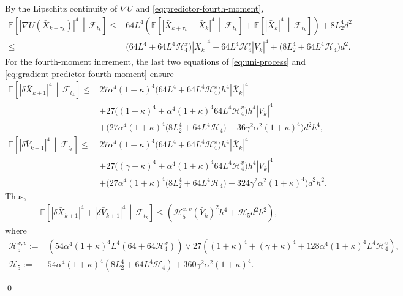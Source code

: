 \documentclass[12pt]{article}
\newenvironment{redtext}
  {\color{black}\ignorespaces}
  {\ignorespacesafterend}
\numberwithin{equation}{section}
\renewenvironment{proof}%
  {\begin{trivlist}%
   \item[]\ignorespaces}%
  {\qed\end{trivlist}}
\renewcommand{\H}{\mathcal{H}}
\begin{document}
\begin{redtext}
\begin{proof}
By the Lipschitz continuity of \(\nabla U\) and
\eqref{eq:predictor-fourth-moment},
\begin{equation}
\label{eq:gradient-predictor-fourth-moment}
\begin{aligned}
\mathbb E
\left[
\left|
\nabla U(\bar X_{k+\tau_k})
\right|^4
\,\middle|\,
\mathcal F_{t_k}
\right]
\leq&
64L^4
\left(
\mathbb E
\left[
\left|
\bar X_{k+\tau_k}-\bar X_k
\right|^4
\,\middle|\,
\mathcal F_{t_k}
\right]
+
\mathbb E
\left[
\left|
\bar X_k
\right|^4
\,\middle|\,
\mathcal F_{t_k}
\right]
\right)
+
8L_2^4 d^2
\\
\leq &
\big(
64L^4
+ 
64L^4 \mathcal H_4^x 
\big)
|\bar X_k|^4
+
64L^4 \mathcal H_4^v  |\bar V_k|^4
+
\big(
8L_2^4
+
64L^4\mathcal H_4 
\big) 
d^2.
\end{aligned}
\end{equation}
For the fourth-moment increment, the last two equations of
\eqref{eq:uni-process} and
\eqref{eq:gradient-predictor-fourth-moment} ensure
\begin{align}
\mathbb E
\left[
\left|
\delta
\bar X_{k+1}
\right|^4
\,\middle|\,
\mathcal F_{t_k}
\right]
\leq&
27\alpha^4(1+\kappa)^4
\big(
64L^4
+ 
64L^4 \mathcal H_4^x 
\big)
h^4
|\bar X_k|^4
\nonumber\\
&
+
27\big(
(1+\kappa)^4
+
\alpha^4(1+\kappa)^4
64L^4 \mathcal H_4^v
\big)
h^4|\bar V_k|^4
\nonumber\\
&
+
\big(27\alpha^4(1+\kappa)^4
\big(
8L_2^4
+
64L^4\mathcal H_4 
\big) 
+
36\gamma^2\alpha^2(1+\kappa)^4\big)
d^2h^4,
\label{eq:position-increment-fourth}\\
\mathbb E
\left[
\left|
\delta
\bar V_{k+1}
\right|^4
\,\middle|\,
\mathcal F_{t_k}
\right]
\leq&
27\alpha^4(1+\kappa)^4
\big(
64L^4
+ 
64L^4 \mathcal H_4^x 
\big)
h^4 |\bar X_k|^4
\nonumber\\
&
+
27
\big(
(\gamma+\kappa)^4
+
\alpha^4(1+\kappa)^4
64L^4 \mathcal H_4^v 
\big)
h^4|\bar V_k|^4
\nonumber\\
&
+
\Big(
27\alpha^4(1+\kappa)^4
\big(
8L_2^4
+
64L^4\mathcal H_4 
\big) 
+
324\gamma^2\alpha^2(1+\kappa)^4
\Big)
d^2h^2.
\label{eq:velocity-increment-fourth}
\end{align}
Thus,
\begin{align}
\mathbb E
\left[
\left|
\delta
\bar X_{k+1}
\right|^4
+
\left|
\delta
\bar V_{k+1}
\right|^4
\,\middle|\,
\mathcal F_{t_k}
\right]
\leq 
\left(
\H_5^{x,v} 
(\bar Y_k)^2
h^4
+
\H_5 
d^2 h^2
\right),
\end{align}
where  
\begin{align}
\mathcal H_5^{x,v}
:=&
\left(
54\alpha^4(1+\kappa)^4L^4
\left(64 + 64 \mathcal H_4^x\right)
\right)
\vee
27\left(
(1+\kappa)^4
+
(\gamma+\kappa)^4
+
128\alpha^4(1+\kappa)^4L^4\mathcal H_4^v
\right),
\\[1mm]
\mathcal H_5
:=&
54\alpha^4(1+\kappa)^4
\left(
8L_2^4+64L^4\mathcal H_4
\right)
+
360\gamma^2\alpha^2(1+\kappa)^4.
\end{align}



\end{proof}
\end{redtext}
\end{document}
